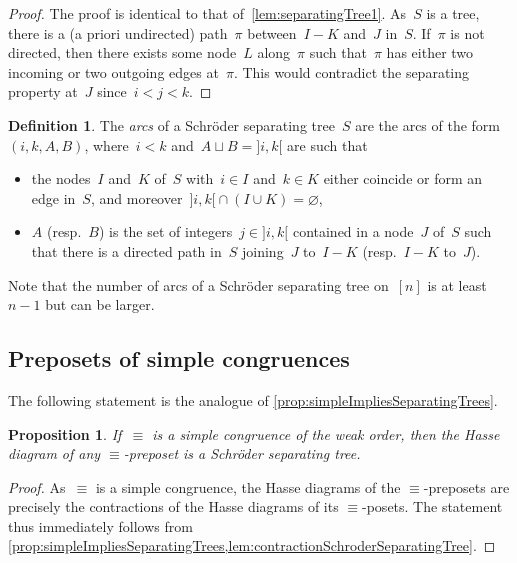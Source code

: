 \documentclass{amsart}
\newtheorem{proposition}[theorem]{Proposition}
\theoremstyle{definition}
\newtheorem{definition}[theorem]{Definition}
\newcommand{\darkblue}{\color{darkblue}} %
\newcommand{\defn}[1]{\textsl{\darkblue #1}} %
\begin{document}
\begin{proof}
The proof is identical to that of~\cref{lem:separatingTree1}.
As~$S$ is a tree, there is a (a priori undirected) path~$\pi$ between~$I-K$ and~$J$ in~$S$.
If~$\pi$ is not directed, then there exists some node~$L$ along~$\pi$ such that~$\pi$ has either two incoming or two outgoing edges at~$\pi$.
This would contradict the separating property at~$J$ since~$i < j < k$.
\end{proof}

\begin{definition}
\label{def:arcsSchroderSeparatingTree}
The \defn{arcs} of a Schröder separating tree~$S$ are the arcs of the form~$(i, k, A, B)$, where~$i < k$ and~$A \sqcup B = {]i,k[}$ are such that
\begin{itemize}
\item the nodes~$I$ and~$K$ of~$S$ with~$i \in I$ and~$k \in K$ either coincide or form an edge in~$S$, and moreover~${]i,k[} \cap (I \cup K) = \varnothing$, 
\item $A$ (resp.~$B$) is the set of integers~$j \in {]i,k[}$ contained in a node~$J$ of~$S$ such that there is a directed path in~$S$ joining~$J$ to~$I-K$ (resp.~$I-K$ to~$J$).
\end{itemize}
\end{definition}

Note that the number of arcs of a Schröder separating tree on~$[n]$ is at least~$n-1$ but can be larger.


\subsection{Preposets of simple congruences}
\label{subsec:preposetsSimpleCongruences}

The following statement is the analogue of \cref{prop:simpleImpliesSeparatingTrees}.

\begin{proposition}
\label{prop:simpleImpliesSchroderSeparatingTrees}
If~$\equiv$ is a simple congruence of the weak order, then the Hasse diagram of any $\equiv$-preposet is a Schröder separating tree.
\end{proposition}

\begin{proof}
As~$\equiv$ is a simple congruence, the Hasse diagrams of the $\equiv$-preposets are precisely the contractions of the Hasse diagrams of its $\equiv$-posets.
The statement thus immediately follows from \cref{prop:simpleImpliesSeparatingTrees,lem:contractionSchroderSeparatingTree}.
\end{proof}
\end{document}
